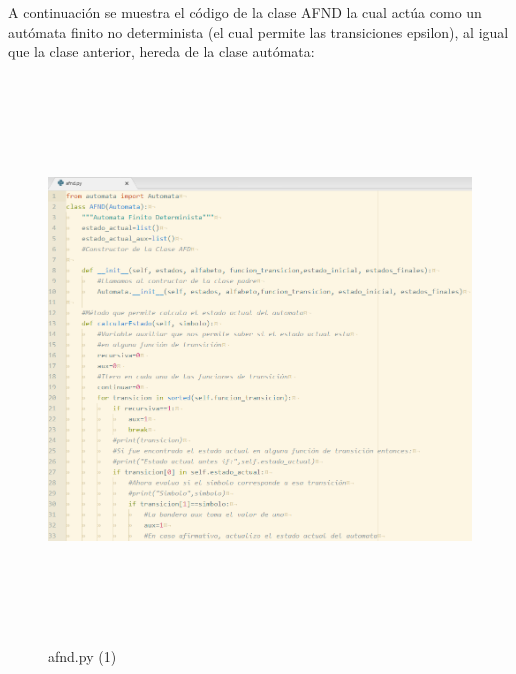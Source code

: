 	A continuación se muestra el código de la clase AFND la cual actúa como un autómata finito no determinista (el cual permite las transiciones epsilon), al igual que la clase anterior, hereda de la clase autómata:\\
	\begin{figure}[H]
	\begin{center}
		\includegraphics[width=15cm, height=15cm]{img/afnd_1.png}
		\caption{afnd.py (1)}
		\label{fig:tablas4}
	\end{center}
	\end{figure}
